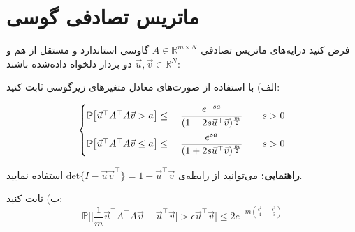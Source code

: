 \section[]{ماتریس تصادفی گوسی}
فرض کنید درایه‌های ماتریس تصادفی
$A \in \mathbb{R}^{m \times N}$
گاوسی استاندارد و مستقل از هم و
$\vec{u},\vec{v} \in \mathbb{R}^N$
دو بردار دلخواه داده‌شده باشند:

الف) با استفاده از صورت‌های معادل متغیرهای زیرگوسی ثابت کنید:

\[\begin{cases} 
\vspace{2mm}
\mathbb{P}\big[\vec{u}^\top A^\top A \vec{v} > a\big]\leq\begin{array}{rrclcl}
\displaystyle
\end{array}\dfrac{e^{-sa}}{({1-{2s} \vec{u}^\top \vec{v}})^{\frac{m}{{2}}}} &\quad s>0 \\
\mathbb{P}\big[\vec{u}^\top A^\top A \vec{v}\leq a\big]\leq\begin{array}{rrclcl}
\displaystyle
\end{array}\dfrac{e^{sa}}{({1+{2s} \vec{u}^\top\vec{v}})^{\frac{m}{{2}}}} &\quad s>0  
\end{cases}
\]

\textbf{راهنمایی:}
 می‌توانید از رابطه‌ی
$\mathrm{det}\{I - \vec{u}\vec{v}^\top\} = 1 - \vec{u}^\top \vec{v}$
 استفاده نمایید.
 
 ب) ثابت کنید: 
 \begin{equation}
 	\nonumber
 	\mathbb{P}\big[\lvert\frac{1}{m}\vec{u}^\top A^\top A \vec{v} - \vec{u}^\top \vec{v} \rvert > \epsilon \vec{u}^\top \vec{v} \big] \leq 2e^{-m(\frac{\epsilon^2}{4}-\frac{\epsilon^3}{6})}
 \end{equation}
